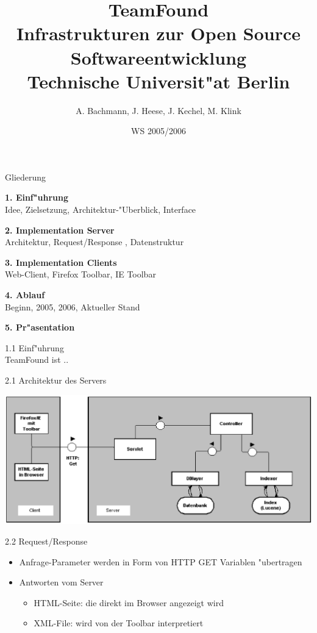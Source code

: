 \documentclass[landscape]{slides}
\begin{document}
%
\title{TeamFound\\Infrastrukturen zur Open Source Softwareentwicklung\\Technische Universit"at Berlin}
\author{A. Bachmann, J. Heese, J. Kechel, M. Klink}
\date{WS 2005/2006}

%
\maketitle%
%
\begin{slide}{Gliederung}

\textbf{1. Einf"uhrung}\\
Idee, Zielsetzung, Architektur-"Uberblick, Interface

\textbf{2. Implementation Server}\\
Architektur, Request/Response , Datenstruktur 

\textbf{3. Implementation Clients}\\
Web-Client, Firefox Toolbar, IE Toolbar

\textbf{4. Ablauf}\\
Beginn, 2005, 2006, Aktueller Stand

\textbf{5. Pr"asentation}
\end{slide}
%
%
%
%
\begin{slide}{1.1 Einf"uhrung}\\
TeamFound ist ..
\end{slide}
%
%
%
\begin{slide}{2.1 Architektur des Servers}\\
\begin{center}
\includegraphics{bilder/aufbau2.eps}
\end{center}
\end{slide}
%
\begin{slide}{2.2 Request/Response }\\
\begin{itemize}
\item Anfrage-Parameter werden in Form von HTTP GET Variablen "ubertragen
\item Antworten vom Server
\begin{itemize}
\item HTML-Seite: die direkt im Browser angezeigt wird
\item XML-File: wird von der Toolbar interpretiert
\end{itemize}	
\end{itemize}
\end{slide}
\end{document}
